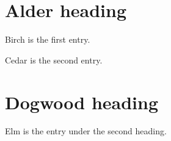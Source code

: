 \documentclass[preset=resume]{ltflow}
\begin{document}
\section{Alder heading}
Birch is the first entry.

Cedar is the second entry.

\section{Dogwood heading}
Elm is the entry under the second heading.
\end{document}
